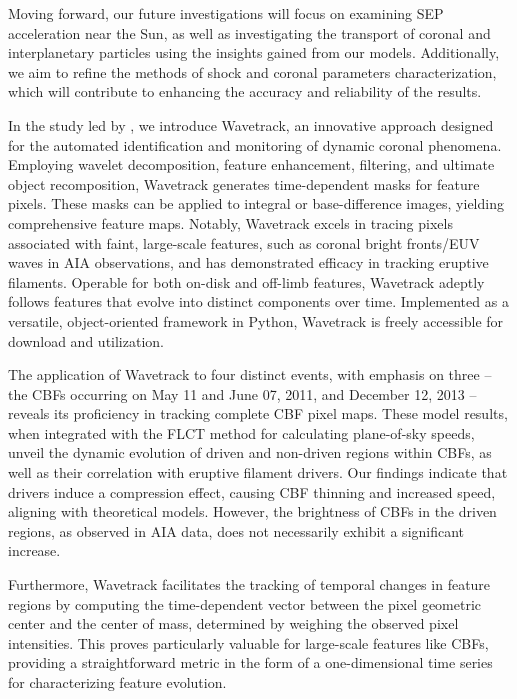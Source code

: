 Moving forward, our future investigations will focus on examining SEP acceleration near the Sun, as well as investigating the transport of coronal and interplanetary particles using the insights gained from our models. Additionally, we aim to refine the methods of shock and coronal parameters characterization, which will contribute to enhancing the accuracy and reliability of the results.

In the study led by \citet{stepanyuk_2022}, we introduce Wavetrack, an innovative approach designed for the automated identification and monitoring of dynamic coronal phenomena. Employing wavelet decomposition, feature enhancement, filtering, and ultimate object recomposition, Wavetrack generates time-dependent masks for feature pixels. These masks can be applied to integral or base-difference images, yielding comprehensive feature maps. Notably, Wavetrack excels in tracing pixels associated with faint, large-scale features, such as coronal bright fronts/EUV waves in AIA observations, and has demonstrated efficacy in tracking eruptive filaments.
Operable for both on-disk and off-limb features, Wavetrack adeptly follows features that evolve into distinct components over time. Implemented as a versatile, object-oriented framework in Python, Wavetrack is freely accessible for download and utilization.

The application of Wavetrack to four distinct events, with emphasis on three – the CBFs occurring on May 11 and June 07, 2011, and December 12, 2013 – reveals its proficiency in tracking complete CBF pixel maps. These model results, when integrated with the FLCT method for calculating plane-of-sky speeds, unveil the dynamic evolution of driven and non-driven regions within CBFs, as well as their correlation with eruptive filament drivers. Our findings indicate that drivers induce a compression effect, causing CBF thinning and increased speed, aligning with theoretical models. However, the brightness of CBFs in the driven regions, as observed in AIA data, does not necessarily exhibit a significant increase.

Furthermore, Wavetrack facilitates the tracking of temporal changes in feature regions by computing the time-dependent vector between the pixel geometric center and the center of mass, determined by weighing the observed pixel intensities. This proves particularly valuable for large-scale features like CBFs, providing a straightforward metric in the form of a one-dimensional time series for characterizing feature evolution.

